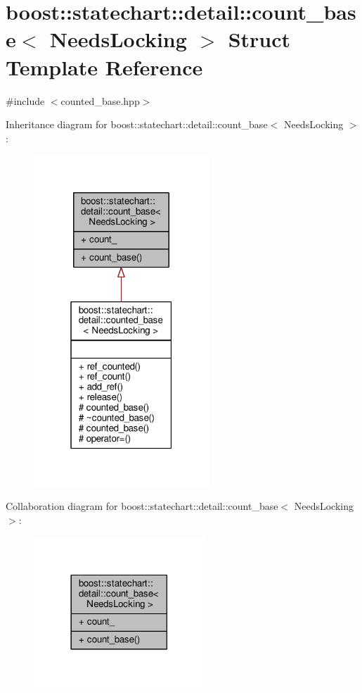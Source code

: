 \hypertarget{structboost_1_1statechart_1_1detail_1_1count__base}{}\section{boost\+:\+:statechart\+:\+:detail\+:\+:count\+\_\+base$<$ Needs\+Locking $>$ Struct Template Reference}
\label{structboost_1_1statechart_1_1detail_1_1count__base}


{\ttfamily \#include $<$counted\+\_\+base.\+hpp$>$}



Inheritance diagram for boost\+:\+:statechart\+:\+:detail\+:\+:count\+\_\+base$<$ Needs\+Locking $>$\+:
\nopagebreak
\begin{figure}[H]
\begin{center}
\leavevmode
\includegraphics[width=187pt]{structboost_1_1statechart_1_1detail_1_1count__base__inherit__graph}
\end{center}
\end{figure}


Collaboration diagram for boost\+:\+:statechart\+:\+:detail\+:\+:count\+\_\+base$<$ Needs\+Locking $>$\+:
\nopagebreak
\begin{figure}[H]
\begin{center}
\leavevmode
\includegraphics[width=182pt]{structboost_1_1statechart_1_1detail_1_1count__base__coll__graph}
\end{center}
\end{figure}
